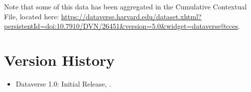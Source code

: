 \documentclass[12pt]{article}
\begin{document}
Note that some of this data has been aggregated in the Cumulative Contextual File, located here: \url{https://dataverse.harvard.edu/dataset.xhtml?persistentId=doi:10.7910/DVN/26451&version=5.0&widget=dataverse@cces}.



\section{Version History}

\begin{itemize}
\item Dataverse 1.0: Initial Release, .
\end{itemize}	
	
\end{document}

